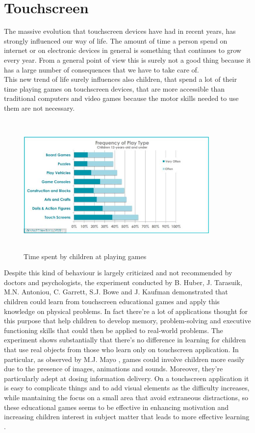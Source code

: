 \section{Touchscreen}
The massive evolution that touchscreen devices have had in recent years, has strongly influenced our way of life. The amount of time a person spend on internet or on electronic devices in general is something that continues to grow every year. From a general point of view this is surely not a good thing because it has a large number of consequences that we have to take care of. \\
This new trend of life surely influences also children, that spend a lot of their time playing games on touchscreen devices, that are more accessible than traditional computers and video games because the motor skills needed to use them are not necessary.\\
\begin{figure}[H]
\centering
\includegraphics[width=10cm, height=7cm]{immagini/touch.png}
\caption{Time spent by children at playing games}\label{fig:timegames}
\end{figure}
Despite this kind of behaviour is largely criticized and not recommended by doctors and psychologists, the experiment conducted by B. Huber, J. Tarasuik, M.N. Antoniou, C. Garrett, S.J. Bowe and J. Kaufman \cite{Huber} demonstrated that children could learn from touchscreen educational games and apply this knowledge on physical problems. In fact there're a lot of applications thought for this purpose that help children to develop memory, problem-solving and executive functioning skills that could then be applied to real-world problems. The experiment shows substantially that there's no difference in learning for children that use real objects from those who learn only on touchscreen application. In particular, as observed by M.J. Mayo \cite{Mayo}, games could involve children more easily due to the presence of images, animations and sounds. Moreover, they're particularly adept at dosing information delivery. On a touchscreen application it is easy to complicate things and to add visual elements as the difficulty increases, while mantaining the focus on a small area that avoid extraneous distractions, so these educational games seems to be effective in enhancing motivation and increasing children interest in subject matter that leads to more effective learning \cite{Annetta}. 
